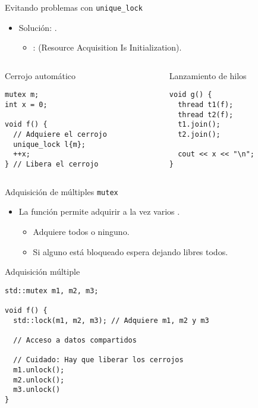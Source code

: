 \begin{frame}[t,fragile]{Evitando problemas con \texttt{unique\_lock}}
\begin{itemize}
  \item Solución: .
    \begin{itemize}
      \item {}:  (Resource Acquisition Is Initialization).
    \end{itemize}
\end{itemize}

\begin{columns}[T]
\begin{column}{.5\textwidth}
\begin{block}{Cerrojo automático}
\begin{lstlisting}
mutex m;
int x = 0;

void f() {
  // Adquiere el cerrojo
  unique_lock l{m}; 
  ++x;
} // Libera el cerrojo
\end{lstlisting}
\end{block}
\end{column}

\begin{column}{.5\textwidth}
\begin{block}{Lanzamiento de hilos}
\begin{lstlisting}
void g() {
  thread t1(f); 
  thread t2(f);
  t1.join(); 
  t2.join();

  cout << x << "\n";
}
\end{lstlisting}
\end{block}
\end{column}
\end{columns}
\end{frame}

\begin{frame}[t,fragile]{Adquisición de múltiples \texttt{mutex}}
\begin{itemize}
  \item La función  permite adquirir a la vez varios .
    \begin{itemize}
      \item Adquiere todos o ninguno.
      \item Si alguno está bloqueado espera dejando libres todos.
    \end{itemize}
\end{itemize}

\begin{block}{Adquisición múltiple}
\begin{lstlisting}[basicstyle=\tiny]
std::mutex m1, m2, m3;

void f() {
  std::lock(m1, m2, m3); // Adquiere m1, m2 y m3

  // Acceso a datos compartidos

  // Cuidado: Hay que liberar los cerrojos
  m1.unlock();
  m2.unlock();
  m3.unlock()
} 
\end{lstlisting}
\end{block}
\end{frame}

